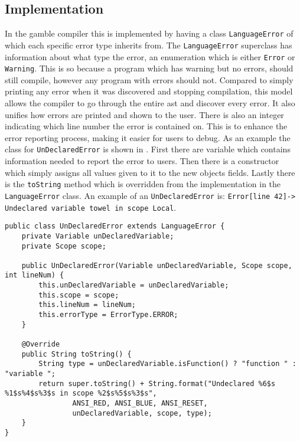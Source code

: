 \subsection*{Implementation}\label{subsec:ImplementationErrorHandling}
In the \gls{gamble} compiler this is implemented by having a class \texttt{LanguageError} of which each specific error type inherits from.
The \texttt{LanguageError} superclass has information about what type the error, an enumeration which is either \texttt{Error} or \texttt{Warning}. 
This is so because a program which has warning but no errors, should still compile, however any program with errors should not. 
Compared to simply printing any error when it was discovered and stopping compilation, this model allows the compiler to go through the entire \acrshort{ast} and discover every error. 
It also unifies how errors are printed and shown to the user. 
There is also an integer indicating which line number the error is contained on.
This is to enhance the error reporting process, making it easier for users to debug. 
As an example the class for \texttt{UnDeclaredError} is shown in .
First there are variable which contains information needed to report the error to users. 
Then there is a constructor which simply assigns all values given to it to the new objects fields.
Lastly there is the \texttt{toString} method which is overridden from the implementation in the \texttt{LanguageError} class. 
An example of an \texttt{UnDeclaredError} is: \texttt{Error[line   42]-> Undeclared variable towel in scope Local}. %

\begin{lstlisting}[caption=The UnDeclaredError class in the \gls{gamble} compiler,numbers=none,frame=tlrb,label={lst:undeclarederrorclass}]
public class UnDeclaredError extends LanguageError {
    private Variable unDeclaredVariable;
    private Scope scope;

    public UnDeclaredError(Variable unDeclaredVariable, Scope scope, int lineNum) {
        this.unDeclaredVariable = unDeclaredVariable;
        this.scope = scope;
        this.lineNum = lineNum;
        this.errorType = ErrorType.ERROR;
    }

    @Override
    public String toString() {
        String type = unDeclaredVariable.isFunction() ? "function " : "variable ";
        return super.toString() + String.format("Undeclared %6$s %1$s%4$s%3$s in scope %2$s%5$s%3$s",
                ANSI_RED, ANSI_BLUE, ANSI_RESET,
                unDeclaredVariable, scope, type);
    }
}
\end{lstlisting}

